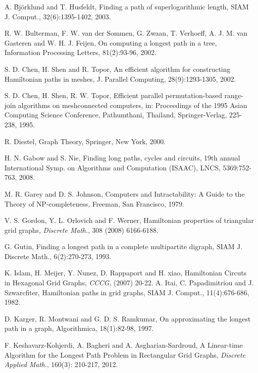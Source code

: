 \documentclass[preprint,12pt]{elsarticle}
\begin{document}
\begin{thebibliography}{00}

A. Bj\"{o}rklund and T. Husfeldt, Finding a path of superlogarithmic
length, SIAM J. Comput., 32(6):1395-1402, 2003.

R. W. Bulterman, F. W. van der Sommen, G. Zwaan, T. Verhoeff, A. J.
M. van Gasteren and W. H. J. Feijen, On computing a longest path in
a tree, Information Processing Letters, 81(2):93-96, 2002.

S. D. Chen, H. Shen and R. Topor, An efficient algorithm for
constructing Hamiltonian paths in meshes, J. Parallel Computing,
28(9):1293-1305, 2002.

S. D. Chen, H. Shen, R. W. Topor, Efficient parallel
permutation-based range-join algorithms on meshconnected computers,
in: Proceedings of the 1995 Asian Computing Science Conference,
Pathumthani, Thailand, Springer-Verlag, 225-238, 1995.

R. Diestel, Graph Theory, Springer, New York, 2000.

H. N. Gabow and S. Nie, Finding long paths, cycles and circuits,
19th annual International Symp. on Algorithms and Computation
(ISAAC), LNCS, 5369:752-763, 2008.

M. R. Garey and D. S. Johnson, Computers and Intractability: A Guide
to the Theory of NP-completeness, Freeman, San Francisco, 1979.

{V. S. Gordon, Y. L. Orlovich and F. Werner, Hamiltonian properties
of triangular grid graphs, \em Discrete Math.}, 308 (2008)
6166-6188.

G. Gutin, Finding a longest path in a complete multipartite digraph,
SIAM J. Discrete Math., 6(2):270-273, 1993.

{K. Islam, H. Meijer, Y. Nunez, D. Rappaport and H. xiao,
Hamiltonian Circuts in Hexagonal Grid Graphs, \em CCCG}, (2007)
20-22.
A. Itai, C. Papadimitriou and J. Szwarcfiter, Hamiltonian paths in
grid graphs, SIAM J. Comput., 11(4):676-686, 1982.


D. Karger, R. Montwani and G. D. S. Ramkumar, On approximating the
longest path in a graph,  Algorithmica, 18(1):82-98, 1997.

F. Keshavarz-Kohjerdi, A. Bagheri and A. Asgharian-Sardroud, A
Linear-time Algorithm for the Longest Path Problem in Rectangular
Grid Graphs, {\em Discrete Applied Math.}, 160(3): 210-217, 2012.


\end{thebibliography}
\end{document}
